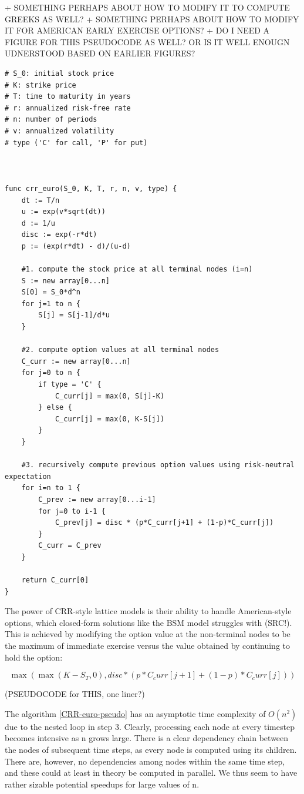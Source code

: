 \documentclass[english,12pt,a4paper,pdftex,sci,utf8]{aaltothesis}
\begin{document}
+ SOMETHING PERHAPS ABOUT HOW TO MODIFY IT TO COMPUTE GREEKS AS WELL?
+ SOMETHING PERHAPS ABOUT HOW TO MODIFY IT FOR AMERICAN EARLY EXERCISE OPTIONS?
+ DO I NEED A FIGURE FOR THIS PSEUDOCODE AS WELL? OR IS IT WELL ENOUGN UDNERSTOOD BASED ON EARLIER FIGURES?

\begin{verbatim}
# S_0: initial stock price
# K: strike price 
# T: time to maturity in years
# r: annualized risk-free rate
# n: number of periods
# v: annualized volatility
# type ('C' for call, 'P' for put)



func crr_euro(S_0, K, T, r, n, v, type) {
    dt := T/n
    u := exp(v*sqrt(dt))
    d := 1/u
    disc := exp(-r*dt)
    p := (exp(r*dt) - d)/(u-d)

    #1. compute the stock price at all terminal nodes (i=n)
    S := new array[0...n]
    S[0] = S_0*d^n
    for j=1 to n {
        S[j] = S[j-1]/d*u
    }

    #2. compute option values at all terminal nodes
    C_curr := new array[0...n]
    for j=0 to n {
        if type = 'C' {
            C_curr[j] = max(0, S[j]-K)
        } else {
            C_curr[j] = max(0, K-S[j])
        }
    }

    #3. recursively compute previous option values using risk-neutral expectation
    for i=n to 1 {
        C_prev := new array[0...i-1]
        for j=0 to i-1 {
            C_prev[j] = disc * (p*C_curr[j+1] + (1-p)*C_curr[j])
        }
        C_curr = C_prev
    }

    return C_curr[0]
}
\end{verbatim} \label{CRR-euro-pseudo}

The power of CRR-style lattice models is their ability to handle American-style options, which closed-form solutions like the BSM model struggles with (SRC!). This is achieved by modifying the option value at the non-terminal nodes to be the maximum of immediate exercise versus the value obtained by continuing to hold the option: 


\begin{equation*}
    \max(\max(K-S_T,0), disc * (p*C_curr[j+1] + (1-p)*C_curr[j]) )
\end{equation*}

(PSEUDOCODE for THIS, one liner?)




The algorithm \ref{CRR-euro-pseudo} has an asymptotic time complexity of $O(n^2)$ due to the nested loop in step 3. Clearly, processing each node at every timestep becomes intensive as n grows large. There is a clear dependency chain between the nodes of subsequent time steps, as every node is computed using its children. There are, however, no dependencies among nodes within the same time step, and these could at least in theory be computed in parallel. We thus seem to have rather sizable potential speedups for large values of n. 
\end{document}
